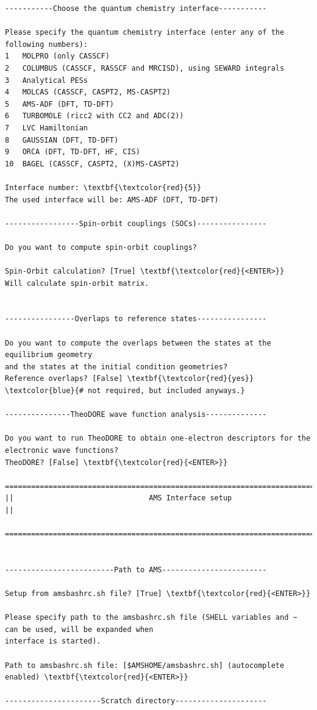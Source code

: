 \documentclass[a4paper,11pt,DIV=15,openany]{scrbook}
\begin{document}
\begin{oframed}
\begin{Verbatim}[commandchars=\\\{\}]
-----------Choose the quantum chemistry interface-----------

Please specify the quantum chemistry interface (enter any of the following numbers):
1	MOLPRO (only CASSCF)
2	COLUMBUS (CASSCF, RASSCF and MRCISD), using SEWARD integrals
3	Analytical PESs
4	MOLCAS (CASSCF, CASPT2, MS-CASPT2)
5	AMS-ADF (DFT, TD-DFT)
6	TURBOMOLE (ricc2 with CC2 and ADC(2))
7	LVC Hamiltonian
8	GAUSSIAN (DFT, TD-DFT)
9	ORCA (DFT, TD-DFT, HF, CIS)
10	BAGEL (CASSCF, CASPT2, (X)MS-CASPT2)

Interface number: \textbf{\textcolor{red}{5}}
The used interface will be: AMS-ADF (DFT, TD-DFT)

-----------------Spin-orbit couplings (SOCs)----------------

Do you want to compute spin-orbit couplings?

Spin-Orbit calculation? [True] \textbf{\textcolor{red}{<ENTER>}} 
Will calculate spin-orbit matrix.


----------------Overlaps to reference states----------------

Do you want to compute the overlaps between the states at the equilibrium geometry 
and the states at the initial condition geometries?
Reference overlaps? [False] \textbf{\textcolor{red}{yes}}    \textcolor{blue}{# not required, but included anyways.}

---------------TheoDORE wave function analysis--------------

Do you want to run TheoDORE to obtain one-electron descriptors for the electronic wave functions?
TheoDORE? [False] \textbf{\textcolor{red}{<ENTER>}} 

================================================================================
||                               AMS Interface setup                              ||
  ================================================================================


-------------------------Path to AMS------------------------

Setup from amsbashrc.sh file? [True] \textbf{\textcolor{red}{<ENTER>}}

Please specify path to the amsbashrc.sh file (SHELL variables and ~ can be used, will be expanded when 
interface is started).

Path to amsbashrc.sh file: [$AMSHOME/amsbashrc.sh] (autocomplete enabled) \textbf{\textcolor{red}{<ENTER>}} 

----------------------Scratch directory---------------------


\end{Verbatim}
\end{oframed}
\end{document}
